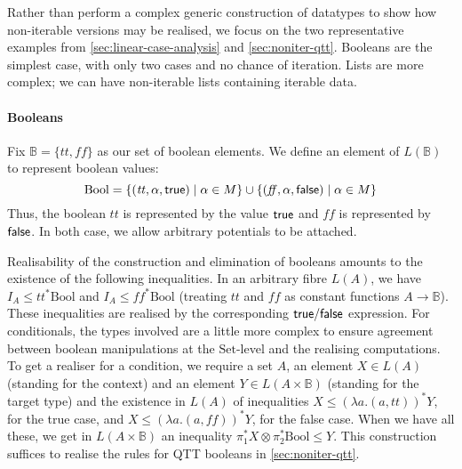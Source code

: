 \documentclass[acmsmall,review,screen,anonymous]{acmart}
\newcommand{\Set}{\mathrm{Set}}
\begin{document}
Rather than perform a complex generic construction of datatypes to
show how non-iterable versions may be realised, we focus on the two
representative examples from \autoref{sec:linear-case-analysis} and
\autoref{sec:noniter-qtt}. Booleans are the simplest case, with only
two cases and no chance of iteration. Lists are more complex; we can
have non-iterable lists containing iterable data.

\paragraph{Booleans} Fix $\mathbb{B} = \{ \mathit{tt}, \mathit{ff} \}$
as our set of boolean elements. We define an element of
$L(\mathbb{B})$ to represent boolean values:
\begin{displaymath}
  \mathrm{Bool} = \{ (\mathit{tt}, \alpha, \mathsf{true}) \mid \alpha \in M \} \cup \{ (\mathit{ff}, \alpha, \mathsf{false}) \mid \alpha \in M \}
\end{displaymath}
Thus, the boolean $\mathit{tt}$ is represented by the value $\mathsf{true}$
and $\mathit{ff}$ is represented by $\mathsf{false}$. In both case, we
allow arbitrary potentials to be attached.

Realisability of the construction and elimination of booleans amounts
to the existence of the following inequalities. In an arbitrary fibre
$L(A)$, we have $I_A \leq \mathit{tt}^* \mathrm{Bool}$ and
$I_A \leq \mathit{ff}^* \mathrm{Bool}$ (treating $\mathit{tt}$ and
$\mathit{ff}$ as constant functions $A \to \mathbb{B}$). These
inequalities are realised by the corresponding $\mathsf{true}/\mathsf{false}$
expression. For conditionals, the types involved are a little more
complex to ensure agreement between boolean manipulations at the
$\Set$-level and the realising computations. To get a realiser for a
condition, we require a set $A$, an element $X \in L(A)$ (standing for
the context) and an element $Y \in L(A \times \mathbb{B})$ (standing
for the target type) and the existence in $L(A)$ of inequalities
$X \leq (\lambda a. (a, \mathit{tt}))^* Y$, for the true case, and
$X \leq (\lambda a. (a, \mathit{ff}))^* Y$, for the false case. When
we have all these, we get in $L(A \times \mathbb{B})$ an inequality
$\pi_1^* X \otimes \pi_2^* \mathrm{Bool} \leq Y$. This construction
suffices to realise the rules for QTT booleans in
\autoref{sec:noniter-qtt}.
\end{document}

